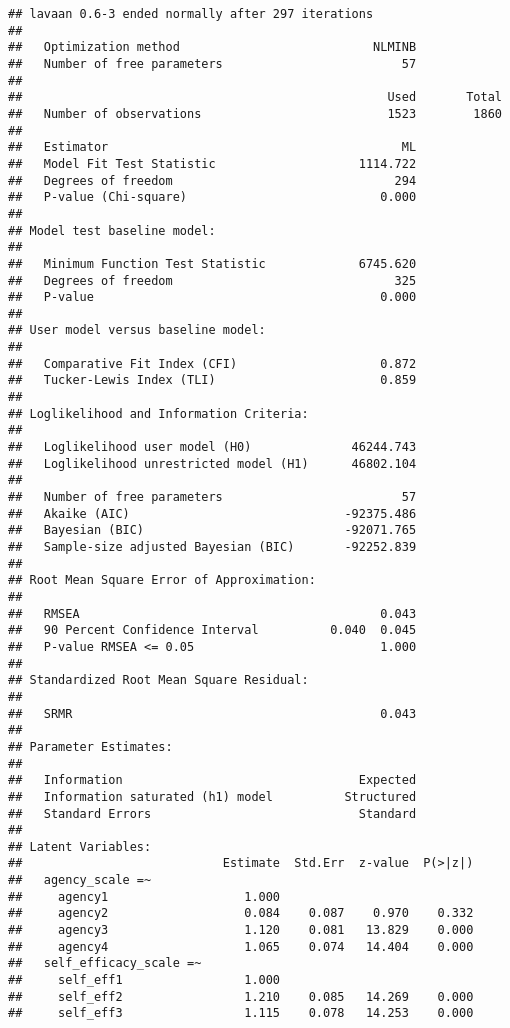 \documentclass[9pt,]{article}
\begin{document}
\begin{verbatim}
## lavaan 0.6-3 ended normally after 297 iterations
## 
##   Optimization method                           NLMINB
##   Number of free parameters                         57
## 
##                                                   Used       Total
##   Number of observations                          1523        1860
## 
##   Estimator                                         ML
##   Model Fit Test Statistic                    1114.722
##   Degrees of freedom                               294
##   P-value (Chi-square)                           0.000
## 
## Model test baseline model:
## 
##   Minimum Function Test Statistic             6745.620
##   Degrees of freedom                               325
##   P-value                                        0.000
## 
## User model versus baseline model:
## 
##   Comparative Fit Index (CFI)                    0.872
##   Tucker-Lewis Index (TLI)                       0.859
## 
## Loglikelihood and Information Criteria:
## 
##   Loglikelihood user model (H0)              46244.743
##   Loglikelihood unrestricted model (H1)      46802.104
## 
##   Number of free parameters                         57
##   Akaike (AIC)                              -92375.486
##   Bayesian (BIC)                            -92071.765
##   Sample-size adjusted Bayesian (BIC)       -92252.839
## 
## Root Mean Square Error of Approximation:
## 
##   RMSEA                                          0.043
##   90 Percent Confidence Interval          0.040  0.045
##   P-value RMSEA <= 0.05                          1.000
## 
## Standardized Root Mean Square Residual:
## 
##   SRMR                                           0.043
## 
## Parameter Estimates:
## 
##   Information                                 Expected
##   Information saturated (h1) model          Structured
##   Standard Errors                             Standard
## 
## Latent Variables:
##                            Estimate  Std.Err  z-value  P(>|z|)
##   agency_scale =~                                             
##     agency1                   1.000                           
##     agency2                   0.084    0.087    0.970    0.332
##     agency3                   1.120    0.081   13.829    0.000
##     agency4                   1.065    0.074   14.404    0.000
##   self_efficacy_scale =~                                      
##     self_eff1                 1.000                           
##     self_eff2                 1.210    0.085   14.269    0.000
##     self_eff3                 1.115    0.078   14.253    0.000

\end{verbatim}
\end{document}
